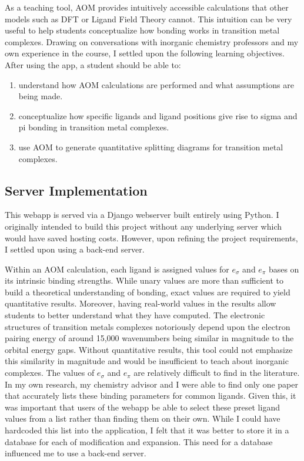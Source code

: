 \documentclass[10pt,twocolumn]{article}
\begin{document}
As a teaching tool, AOM provides intuitively accessible calculations that other models such as DFT or Ligand Field Theory cannot. This intuition can be very useful to help students conceptualize how bonding works in transition metal complexes. Drawing on conversations with inorganic chemistry professors and my own experience in the course, I settled upon the following learning objectives. After using the app, a student should be able to:
\begin{enumerate}
	\item understand how AOM calculations are performed and what assumptions are being made.
	\item conceptualize how specific ligands and ligand positions give rise to sigma and pi bonding in transition metal complexes.
	\item use AOM to generate quantitative splitting diagrams for transition metal complexes.
\end{enumerate}

\subsection{Server Implementation}
This webapp is served via a Django webserver built entirely using Python. I originally intended to build this project without any underlying server which would have saved hosting costs. However, upon refining the project requirements, I settled upon using a back-end server.

Within an AOM calculation, each ligand is assigned values for $e_\sigma$ and $e_\pi$ bases on its intrinsic binding strengths. While unary values are more than sufficient to build a theoretical understanding of bonding, exact values are required to yield quantitative results. Moreover, having real-world values in the results allow students to better understand what they have computed. The electronic structures of transition metals complexes notoriously depend upon the electron pairing energy of around 15,000 wavenumbers being similar in magnitude to the orbital energy gaps. Without quantitative results, this tool could not emphasize this similarity in magnitude and would be insufficient to teach about inorganic complexes. The values of $e_\sigma$ and $e_\pi$ are relatively difficult to find in the literature. In my own research, my chemistry advisor and I were able to find only one paper that accurately lists these binding parameters for common ligands. Given this, it was important that users of the webapp be able to select these preset ligand values from a list rather than finding them on their own. While I could have hardcoded this list into the application, I felt that it was better to store it in a database for each of modification and expansion. This need for a database influenced me to use a back-end server.
\end{document}
